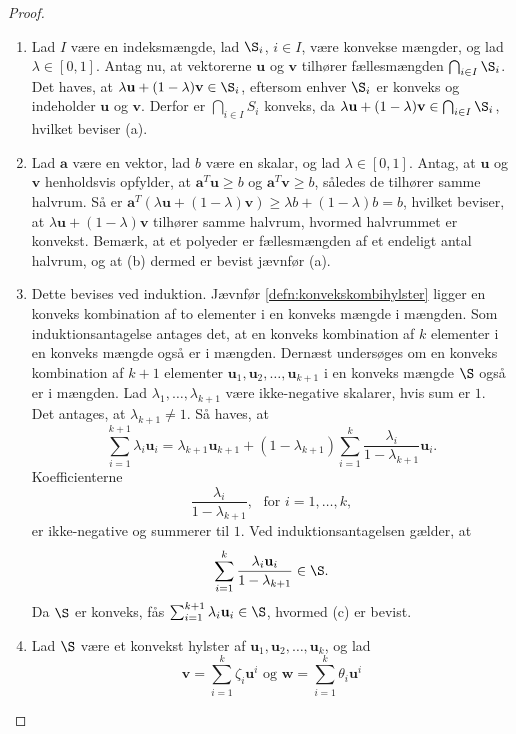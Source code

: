 \begin{proof}
\begin{enumerate}[label=(\alph*)]
\item Lad $I$ være en indeksmængde, lad $\S_i$, $i \in I$, være konvekse mængder, og lad $ \lambda \in [0,1]$.
Antag nu, at vektorerne $\textbf{u}$ og $\textbf{v}$ tilhører fællesmængden $ \bigcap_{i \in I} \S_i$. 
Det haves, at $ \lambda \textbf{u} + (1 - \lambda )\textbf{v} \in \S_i$, eftersom enhver $\S_i$ er konveks og  indeholder $\textbf{u}$ og $\textbf{v}$. Derfor er $ \bigcap_{i \in I} S_i$ konveks, da $ \lambda \textbf{u} + (1 - \lambda )\textbf{v} \in  \bigcap_{i \in I} \S_i$, hvilket beviser (a).
%
\item Lad $\textbf{a}$ være en vektor, lad $b$ være en skalar, og lad $ \lambda \in [0,1]$. 
Antag, at $\textbf{u}$ og $\textbf{v}$ henholdsvis opfylder, at $\textbf{a}^T \textbf{u} \geq b$ og $\textbf{a}^T \textbf{v} \geq b$, således de tilhører samme halvrum. 
Så er $\textbf{a}^T (\lambda \textbf{u} + (1 - \lambda) \textbf{v} ) \geq \lambda b + (1 - \lambda ) b = b$, hvilket beviser, at $ \lambda \textbf{u} + (1 - \lambda )\textbf{v}$ tilhører samme halvrum, hvormed halvrummet er konvekst.
Bemærk, at et polyeder er fællesmængden af et endeligt antal halvrum, og at (b) dermed er bevist jævnfør (a).
%
\item  Dette bevises ved induktion.
Jævnfør \ref{defn:konvekskombihylster} ligger en konveks kombination af to elementer i en konveks mængde i mængden.
Som induktionsantagelse antages det, at en konveks kombination af $k$ elementer i en konveks mængde også er i mængden.
Dernæst undersøges om en konveks kombination af $k+1$ elementer $\textbf{u}_1,\textbf{u}_2,\ldots,\textbf{u}_{k+1}$ i en konveks mængde $\S$ også er i mængden.
Lad $\lambda_1,\ldots,\lambda_{k+1}$ være ikke-negative skalarer, hvis sum er $1$. 
Det antages, at $\lambda_{k+1}\neq1$. 
Så haves, at
%
$$\sum^{k+1}_{i=1}\lambda_i\textbf{u}_i=\lambda_{k+1}\textbf{u}_{k+1}+(1-\lambda_{k+1})\sum^{k}_{i=1}\dfrac{\lambda_i}{1-\lambda_{k+1}}\textbf{u}_i.$$
%
Koefficienterne 
%
$$\frac{\lambda_i}{1-\lambda_{k+1}}, \phantom{i} \text{ for } i=1,\ldots,k,$$
%
er ikke-negative og summerer til $1$. 
Ved induktionsantagelsen gælder, at
%
$$\sum^{k}_{i=1}\frac{\lambda_i\textbf{u}_i}{1-\lambda_{k+1}}\in \S.$$
%
Da $\S$ er konveks, fås 
$\sum^{k+1}_{i=1}\lambda_i\textbf{u}_i\in \S$, hvormed (c) er bevist. 
%
\item Lad $\S$ være et konvekst hylster af $\textbf{u}_1, \textbf{u}_2, \ldots, \textbf{u}_k$, og lad
%
$$\textbf{v} = \sum_{i=1}^{k} \zeta_i \textbf{u}^i \text{ og } \textbf{w} = \sum_{i=1}^{k} \theta_i \textbf{u}^i$$

\end{enumerate}
\end{proof}
